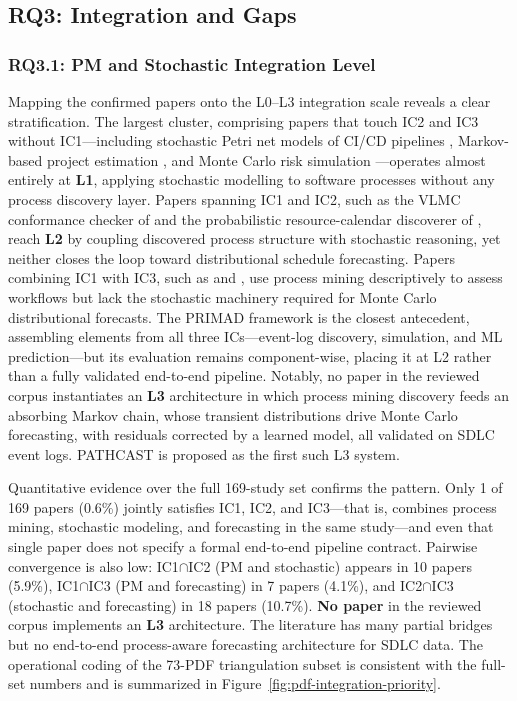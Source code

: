 \subsection{RQ3: Integration and Gaps}
\label{sec:slr-rq3}

\subsubsection{RQ3.1: PM and Stochastic Integration Level}

Mapping the confirmed papers onto the L0--L3 integration scale reveals a clear
stratification. The largest cluster, comprising papers that touch IC2 and IC3
without IC1---including stochastic Petri net models of CI/CD pipelines
\cite{bhadra2022,bhadra2023}, Markov-based project estimation
\cite{massitela2018,tyagi2021}, and Monte Carlo risk simulation
\cite{lunesu2021,magennis2015}---operates almost entirely at \textbf{L1},
applying stochastic modelling to software processes without any process
discovery layer. Papers spanning IC1 and IC2, such as the VLMC conformance
checker of \cite{incerto2025} and the probabilistic resource-calendar discoverer
of \cite{lopezpintado2023}, reach \textbf{L2} by coupling discovered process
structure with stochastic reasoning, yet neither closes the loop toward
distributional schedule forecasting. Papers combining IC1 with IC3, such as
\cite{gupta2017} and \cite{caldeira2022}, use process mining descriptively to
assess workflows but lack the stochastic machinery required for Monte Carlo
distributional forecasts. The PRIMAD framework \cite{guinea2025} is the closest
antecedent, assembling elements from all three ICs---event-log discovery,
simulation, and ML prediction---but its evaluation remains component-wise,
placing it at L2 rather than a fully validated end-to-end pipeline. Notably,
no paper in the reviewed corpus instantiates an \textbf{L3} architecture in
which process mining discovery feeds an absorbing Markov chain, whose transient
distributions drive Monte Carlo forecasting, with residuals corrected by a
learned model, all validated on SDLC event logs. PATHCAST is proposed as the
first such L3 system.

Quantitative evidence over the full 169-study set confirms the pattern. Only
1 of 169 papers (0.6\%) jointly satisfies IC1, IC2, and IC3---that is,
combines process mining, stochastic modeling, and forecasting in the same
study---and even that single paper does not specify a formal end-to-end
pipeline contract. Pairwise convergence is also low: IC1$\cap$IC2 (PM and
stochastic) appears in 10 papers (5.9\%), IC1$\cap$IC3 (PM and forecasting)
in 7 papers (4.1\%), and IC2$\cap$IC3 (stochastic and forecasting) in 18
papers (10.7\%). \textbf{No paper} in the reviewed corpus implements an
\textbf{L3} architecture. The literature has many partial bridges but no
end-to-end process-aware forecasting architecture for SDLC data. The
operational coding of the 73-PDF triangulation subset is consistent with the
full-set numbers and is summarized in
Figure~\ref{fig:pdf-integration-priority}.

